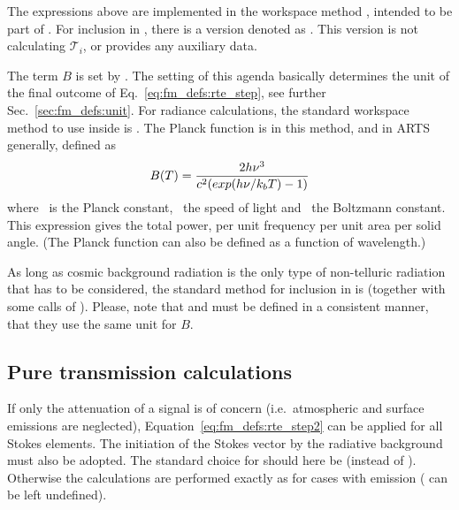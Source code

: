 The expressions above are implemented in the workspace method
, intended to be part of
. For inclusion in
, there is a version denoted as
. This version is not calculating
$\mathcal{T}_i$, or provides any auxiliary data. 

The term $B$ is set by . The setting of this agenda
basically determines the unit of the final outcome of
Eq.~\ref{eq:fm_defs:rte_step}, see further Sec.~\ref{sec:fm_defs:unit}.
For radiance calculations, the standard workspace method to use inside 
 is . The Planck function
is in this method, and in ARTS generally, defined as
\begin{equation}
  \label{eq:planck}
  B(T) = \frac{2h\nu^3}
                  {c^2(exp(h\nu/k_bT)-1)}
\end{equation}
where \planckCns\ is the Planck constant, \speedoflight\ the speed of light and
\boltzmannCns\ the Boltzmann constant. This expression gives the total power,
per unit frequency per unit area per solid angle. (The Planck function can also
be defined as a function of wavelength.)

As long as cosmic background radiation is the only type of non-telluric
radiation that has to be considered, the standard method for inclusion in
 is  (together with some calls
of ). Please, note that  and 
 must be defined in a consistent manner, that
they use the same unit for $B$.


\subsection{Pure transmission calculations}
\label{sec:fm_defs:transmission}

If only the attenuation of a signal is of concern (i.e.\ atmospheric and
surface emissions are neglected), Equation~\ref{eq:fm_defs:rte_step2} can be
applied for all Stokes elements. The initiation of the Stokes vector by the
radiative background must also be adopted. The standard choice for
 should here be 
(instead of ). Otherwise the calculations are performed
exactly as for cases with emission ( can be left
undefined).

